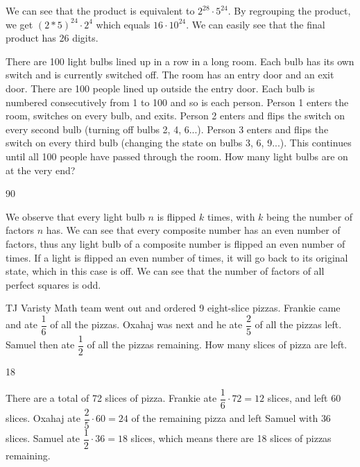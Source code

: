 \documentclass[11pt]{article}
\begin{document}
\begin{solution}
We can see that the product is equivalent to $2^{28} \cdot 5^{24}$. By regrouping the product, we get $(2*5)^{24} \cdot 2^{4}$ which equals $16 \cdot 10^{24}$. We can easily see that the final product has 26 digits. 
\end{solution}


\begin{problem}
There are 100 light bulbs lined up in a row in a long room. Each bulb has its own switch and is currently switched off. The room has an entry door and an exit door. There are 100 people lined up outside the entry door. Each bulb is numbered consecutively from 1 to 100 and so is each person. Person 1 enters the room, switches on every bulb, and exits. Person 2 enters and flips the switch on every second bulb (turning off bulbs 2, 4, 6...). Person 3 enters and flips the switch on every third bulb (changing the state on bulbs 3, 6, 9...). This continues until all 100 people have passed through the room. How many light bulbs are on at the very end?
\end{problem}

\begin{answer}
90
\end{answer}

\begin{solution} %
We observe that every light bulb $n$ is flipped $k$ times, with $k$ being the number of factors $n$ has. We can see that every composite number has an even number of factors, thus any light bulb of a composite number is flipped an even number of times. If a light is flipped an even number of times, it will go back to its original state, which in this case is off. We can see that the number of factors of all perfect squares is odd. 
\end{solution}


\begin{problem} %
TJ Varisty Math team went out and ordered 9 eight-slice pizzas. Frankie came and ate $\dfrac{1}{6}$ of all the pizzas. Oxahaj was next and he ate $\dfrac{2}{5}$ of all the pizzas left. Samuel then ate $\dfrac{1}{2}$ of all the pizzas remaining. How many slices of pizza are left. 
\end{problem}

\begin{answer}
18
\end{answer}

\begin{solution} %
There are a total of 72 slices of pizza. Frankie ate $\dfrac{1}{6} \cdot 72 = 12$ slices, and left 60 slices. Oxahaj ate $\dfrac{2}{5} \cdot 60 = 24$ of the remaining pizza and left Samuel with $36$ slices. Samuel ate $\dfrac{1}{2} \cdot 36 = 18$ slices, which means there are 18 slices of pizzas remaining. 
\end{solution}
\end{document}
